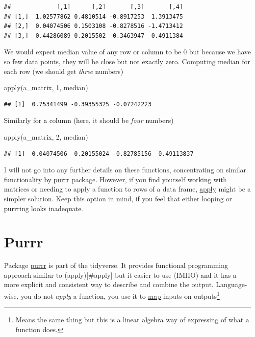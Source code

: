 \documentclass[
]{book}
\newenvironment{Shaded}{\begin{snugshade}}{\end{snugshade}}
\newcommand{\DecValTok}[1]{\textcolor[rgb]{0.00,0.00,0.81}{#1}}
\newcommand{\FunctionTok}[1]{\textcolor[rgb]{0.00,0.00,0.00}{#1}}
\newcommand{\NormalTok}[1]{#1}
\begin{document}
\begin{verbatim}
##             [,1]      [,2]       [,3]       [,4]
## [1,]  1.02577862 0.4810514 -0.8917253  1.3913475
## [2,]  0.04074506 0.1503108 -0.8278516 -1.4713412
## [3,] -0.44286089 0.2015502 -0.3463947  0.4911384
\end{verbatim}

We would expect median value of any row or column to be 0 but because we have so few data points, they will be close but not exactly zero. Computing median for each row (we should get \emph{three} numbers)

\begin{Shaded}
\begin{Highlighting}[]
\FunctionTok{apply}\NormalTok{(a\_matrix, }\DecValTok{1}\NormalTok{, median)}
\end{Highlighting}
\end{Shaded}

\begin{verbatim}
## [1]  0.75341499 -0.39355325 -0.07242223
\end{verbatim}

Similarly for a column (here, it should be \emph{four} numbers)

\begin{Shaded}
\begin{Highlighting}[]
\FunctionTok{apply}\NormalTok{(a\_matrix, }\DecValTok{2}\NormalTok{, median)}
\end{Highlighting}
\end{Shaded}

\begin{verbatim}
## [1]  0.04074506  0.20155024 -0.82785156  0.49113837
\end{verbatim}

I will not go into any further details on these functions, concentrating on similar functionality by \protect\hyperlink{purrr}{purrr} package. However, if you find yourself working with matrices or needing to apply a function to rows of a data frame, \href{https://stat.ethz.ch/R-manual/R-devel/library/base/html/apply.html}{apply} might be a simpler solution. Keep this option in mind, if you feel that either looping or purrring looks inadequate.

\hypertarget{purrr}{%
\section{Purrr}\label{purrr}}

Package \href{https://purrr.tidyverse.org/}{purrr} is part of the tidyverse. It provides functional programming approach similar to (apply){[}\#apply{]} but it easier to use (IMHO) and it has a more explicit and consistent way to describe and combine the output. Language-wise, you do not \emph{apply} a function, you use it to \href{https://purrr.tidyverse.org/reference/map.html}{map} inputs on outputs\footnote{Means the same thing but this is a linear algebra way of expressing of what a function does.}
\end{document}
